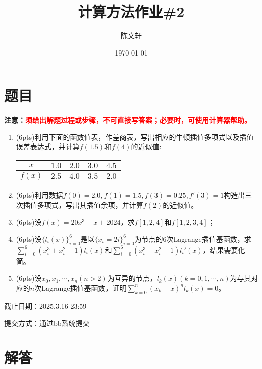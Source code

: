 \documentclass[cn,hazy,green,11pt,normal]{elegantnote}
\title{计算方法作业\#2}
\author{陈文轩}
\institute{KFRC}
\date{\today}
\begin{document}
\maketitle


\section{题目}

    \textbf{注意：\textcolor{red}{须给出解题过程或步骤，不可直接写答案；必要时，可使用计算器帮助。}}

    \begin{enumerate}
        \item (6pts)利用下面的函数值表，作差商表，写出相应的牛顿插值多项式以及插值误差表达式，并计算$f(1.5)$和$f(4)$的近似值:
            \begin{table}[htb]
                \begin{center}
                    \begin{tabular}{|c|c|c|c|c|}
                    \hline
                    $x$ & $1.0$ & $2.0$ & $3.0$ & $4.5$ \\
                    \hline
                    $f(x)$ & $2.5$ & $4.0$ & $3.5$ & $2.0$ \\
                    \hline
                    \end{tabular}
                \end{center}
            \end{table}
        \item (6pts)利用数据$f(0)=2.0,f(1)=1.5,f(3)=0.25,f'(3)=1$构造出三次插值多项式，写出其插值余项，并计算$f(2)$的近似值。
        \item (6pts)设$f(x)=20x^3-x+2024$，求$f[1,2,4]$和$f[1,2,3,4]$；
        \item (6pts)设$\{l_i(x)\}_{i=0}^6$是以$\{x_i=2i\}_{i=0}^6$为节点的$6$次Lagrange插值基函数，求$\sum\limits_{i=0}^6 (x_i^3+x_i^2+1)l_i(x)$和$\sum\limits_{i=0}^6 (x_i^3+x_i^2+1)l_i'(x)$，结果需要化简。
        \item (6pts)设$x_0,x_1,\cdots,x_n(n>2)$为互异的节点，$l_k(x)(k=0,1,\cdots,n)$为与其对应的$n$次Lagrange插值基函数，证明$\sum\limits_{k=0}^n (x_k-x)^n l_k(x)=0$。
    \end{enumerate}

    截止日期：2025.3.16 23:59

    提交方式：通过bb系统提交

\section{解答}
\end{document}
